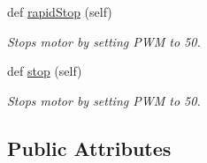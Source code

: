 \begin{DoxyCompactItemize}
def \hyperlink{classmcs_1_1controllers_1_1DriveControl_1_1DriveControl_a522048aff464b5825659301513bfcff1}{rapid\+Stop} (self)
\begin{DoxyCompactList}\small\item\em Stops motor by setting P\+WM to 50. \end{DoxyCompactList}\item 
def \hyperlink{classmcs_1_1controllers_1_1DriveControl_1_1DriveControl_a51f1f2d34adb15537d0ede973bd16312}{stop} (self)
\begin{DoxyCompactList}\small\item\em Stops motor by setting P\+WM to 50. \end{DoxyCompactList}\end{DoxyCompactItemize}
\subsection*{Public Attributes}
